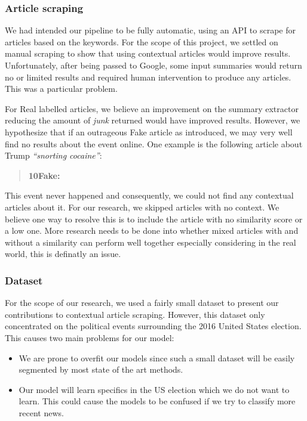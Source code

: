 \documentclass{article}
\begin{document}
\subsubsection*{Article scraping}\label{limitation:article-scraping}

We had intended our pipeline to be fully automatic, using an API to scrape for articles based on the keywords. For the scope of this project, we settled on manual scraping to show that using contextual articles would improve results. Unfortunately, after being passed to Google, some input summaries would return no or limited results and required human intervention to produce any articles. This was a particular problem.

For Real labelled articles, we believe an improvement on the summary extractor reducing the amount of \emph{junk} returned would have improved results. However, we hypothesize that if an outrageous Fake article as introduced, we may very well find no results about the event online. One example is the following article about Trump \emph{``snorting cocaine''}:
\begin{quote}
  \textbf{10Fake:}\quad{}
\end{quote}
This event never happened and consequently, we could not find any contextual articles about it. For our research, we skipped articles with no context. We believe one way to resolve this is to include the article with no similarity score or a low one. More research needs to be done into whether mixed articles with and without a similarity can perform well together especially considering in the real world, this is definatly an issue.

\subsubsection*{Dataset}

For the scope of our research, we used a fairly small dataset to present our contributions to contextual article scraping. However, this dataset only concentrated on the political events surrounding the 2016 United States election. This causes two main problems for our model:
\begin{itemize}
  \item We are prone to overfit our models since such a small dataset will be easily segmented by most state of the art methods.
  \item Our model will learn specifics in the US election which we do not want to learn. This could cause the models to be confused if we try to classify more recent news.
\end{itemize}
\end{document}
